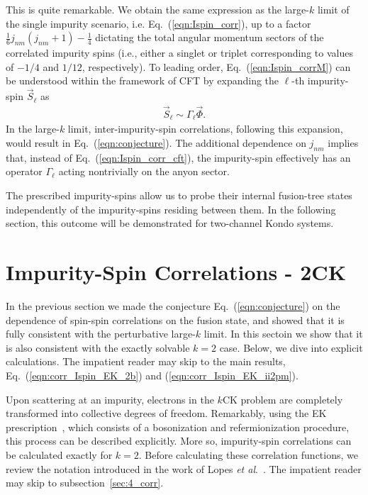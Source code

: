 \documentclass[aps,prb,twocolumn,superscriptaddress]{revtex4-1}
\begin{document}
This is quite remarkable. We obtain the same expression as the large-$k$ limit of the single impurity scenario, i.e. Eq.~(\ref{eqn:Ispin_corr}), up to a factor $\frac{1}{6}j_{nm}(j_{nm}+1)-\frac{1}{4}$ dictating the total angular momentum sectors of the correlated impurity spins (i.e., either a singlet or triplet corresponding to values of $-1/4$ and $1/12$, respectively). To leading order, Eq.~(\ref{eqn:Ispin_corrM}) can be understood within the framework of CFT by expanding the $\ell$-th impurity-spin $\vec{S}_{\ell}$ as~\cite{ludwig1994exact} 
\begin{eqnarray}
\vec{S}_{\ell}\sim \Gamma_{\ell}\vec{\Phi}. \label{eqn:Ispin_exp} 
\end{eqnarray}
In the large-$k$ limit, inter-impurity-spin correlations, following this expansion, would result in Eq.~(\ref{eqn:conjecture}). The additional dependence on $j_{nm}$ implies that, instead of Eq.~(\ref{eqn:Ispin_corr_cft}), the impurity-spin effectively has an operator $\Gamma_{\ell}$ acting nontrivially on the anyon sector. 

The prescribed impurity-spins allow us to probe their internal fusion-tree states independently of the impurity-spins residing between them. In the following section, this outcome will be demonstrated for two-channel Kondo systems. 


\section{Impurity-Spin Correlations - 2CK} \label{sec:4}
In the previous section we made the conjecture Eq.~(\ref{eqn:conjecture}) on the dependence of spin-spin correlations on the fusion state, and showed that it is fully consistent with the perturbative large-$k$ limit. In this sectoin we show that it is also consistent with the exactly solvable $k=2$ case. Below, we dive into explicit calculations. The impatient reader may skip to the main results, Eq.~(\ref{eqn:corr_Ispin_EK_2b}) and (\ref{eqn:corr_Ispin_EK_ii2pm}).

Upon scattering at an impurity, electrons in the $k$CK problem are completely transformed into collective degrees of freedom. Remarkably, using the EK prescription~\cite{emery1992mapping}, which consists of a bosonization and refermionization procedure, this process can be described explicitly. More so, impurity-spin correlations can be calculated exactly for $k=2$. Before calculating these correlation functions, we review the notation introduced in the work of Lopes \textit{et al}.~\cite{lopes2020anyons}. The impatient reader may skip to subsection~\ref{sec:4_corr}. 
\end{document}
